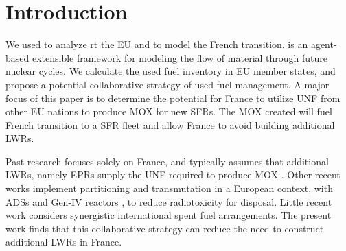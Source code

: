 
\section{Introduction}
We used \Cyclus \cite{huff_fundamental_2016} to analyze
rt the \gls{EU} and to model the French transition. \Cyclus is an agent-based extensible
framework for modeling the flow of material through future nuclear cycles.
We calculate the used fuel
inventory in \gls{EU} member states, and propose a potential collaborative strategy of used fuel
management.
A major focus of this paper is to determine the potential for France to utilize
\gls{UNF} from other \gls{EU} nations to produce \gls{MOX} for new \glspl{SFR}.
The \gls{MOX} created will fuel French transition to a \gls{SFR} fleet
and allow France to avoid building additional \glspl{LWR}.

Past research focuses solely on France, and typically assumes that additional \glspl{LWR},
namely \glspl{EPR} supply the \gls{UNF} required to produce \gls{MOX} \cite{carre_overview_2009, martin_symbiotic_2017, freynet_multiobjective_2016}.
Other recent works implement partitioning and transmutation
in a European context, with \glspl{ADS} and Gen-IV reactors \cite{fazio_study_2013},
to reduce radiotoxicity for disposal.
Little recent work considers synergistic international spent fuel arrangements.
The present work finds that this collaborative strategy can reduce the
need to construct additional \glspl{LWR} in France.
